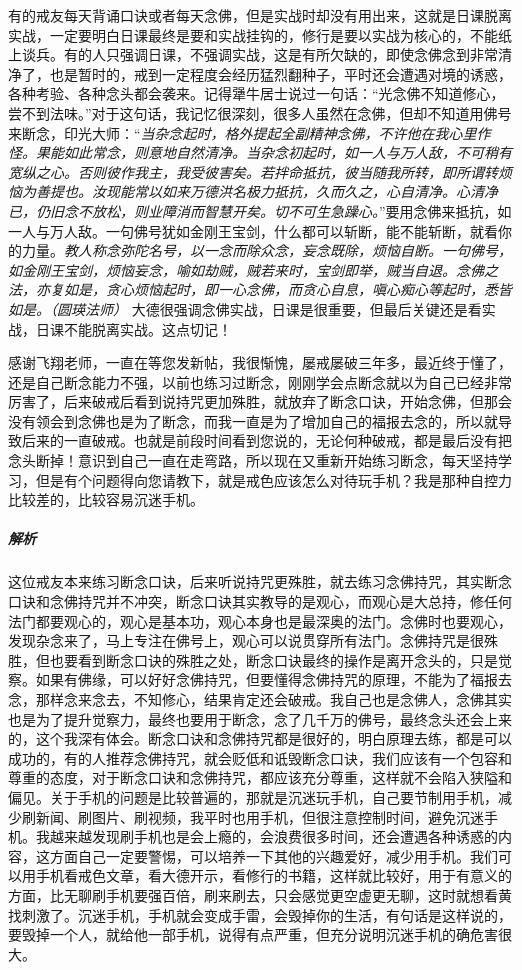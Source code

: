 有的戒友每天背诵口诀或者每天念佛，但是实战时却没有用出来，这就是日课脱离实战，一定要明白日课最终是要和实战挂钩的，修行是要以实战为核心的，不能纸上谈兵。有的人只强调日课，不强调实战，这是有所欠缺的，即使念佛念到非常清净了，也是暂时的，戒到一定程度会经历猛烈翻种子，平时还会遭遇对境的诱惑，各种考验、各种念头都会袭来。记得犟牛居士说过一句话：“光念佛不知道修心，尝不到法味。”对于这句话，我记忆很深刻，很多人虽然在念佛，但却不知道用佛号来断念，印光大师：“\textit{当杂念起时，格外提起全副精神念佛，不许他在我心里作怪。果能如此常念，则意地自然清净。当杂念初起时，如一人与万人敌，不可稍有宽纵之心。否则彼作我主，我受彼害矣。若拌命抵抗，彼当随我所转，即所谓转烦恼为善提也。汝现能常以如来万德洪名极力抵抗，久而久之，心自清净。心清净已，仍旧念不放松，则业障消而智慧开矣。切不可生急躁心。}”要用念佛来抵抗，如一人与万人敌。一句佛号犹如金刚王宝剑，什么都可以斩断，能不能斩断，就看你的力量。\textit{教人称念弥陀名号，以一念而除众念，妄念既除，烦恼自断。一句佛号，如金刚王宝剑，烦恼妄念，喻如劫贼，贼若来时，宝剑即举，贼当自退。念佛之法，亦复如是，贪心烦恼起时，即一心念佛，而贪心自息，嗔心痴心等起时，悉皆如是。（圆瑛法师）} 大德很强调念佛实战，日课是很重要，但最后关键还是看实战，日课不能脱离实战。这点切记！

\begin{case}[练习过程中的问题]
    感谢飞翔老师，一直在等您发新帖，我很惭愧，屡戒屡破三年多，最近终于懂了，还是自己断念能力不强，以前也练习过断念，刚刚学会点断念就以为自己已经非常厉害了，后来破戒后看到说持咒更加殊胜，就放弃了断念口诀，开始念佛，但那会没有领会到念佛也是为了断念，而我一直是为了增加自己的福报去念的，所以就导致后来的一直破戒。也就是前段时间看到您说的，无论何种破戒，都是最后没有把念头断掉！意识到自己一直在走弯路，所以现在又重新开始练习断念，每天坚持学习，但是有个问题得向您请教下，就是戒色应该怎么对待玩手机？我是那种自控力比较差的，比较容易沉迷手机。
    \subparagraph{解析} 这位戒友本来练习断念口诀，后来听说持咒更殊胜，就去练习念佛持咒，其实断念口诀和念佛持咒并不冲突，断念口诀其实教导的是观心，而观心是大总持，修任何法门都要观心的，观心是基本功，观心本身也是最深奥的法门。念佛时也要观心，发现杂念来了，马上专注在佛号上，观心可以说贯穿所有法门。念佛持咒是很殊胜，但也要看到断念口诀的殊胜之处，断念口诀最终的操作是离开念头的，只是觉察。如果有佛缘，可以好好念佛持咒，但要懂得念佛持咒的原理，不能为了福报去念，那样念来念去，不知修心，结果肯定还会破戒。我自己也是念佛人，念佛其实也是为了提升觉察力，最终也要用于断念，念了几千万的佛号，最终念头还会上来的，这个我深有体会。断念口诀和念佛持咒都是很好的，明白原理去练，都是可以成功的，有的人推荐念佛持咒，就会贬低和诋毁断念口诀，我们应该有一个包容和尊重的态度，对于断念口诀和念佛持咒，都应该充分尊重，这样就不会陷入狭隘和偏见。关于手机的问题是比较普遍的，那就是沉迷玩手机，自己要节制用手机，减少刷新闻、刷图片、刷视频，我平时也用手机，但很注意控制时间，避免沉迷手机。我越来越发现刷手机也是会上瘾的，会浪费很多时间，还会遭遇各种诱惑的内容，这方面自己一定要警惕，可以培养一下其他的兴趣爱好，减少用手机。我们可以用手机看戒色文章，看大德开示，看修行的书籍，这样就比较好，用于有意义的方面，比无聊刷手机要强百倍，刷来刷去，只会感觉更空虚更无聊，这时就想看黄找刺激了。沉迷手机，手机就会变成手雷，会毁掉你的生活，有句话是这样说的，要毁掉一个人，就给他一部手机，说得有点严重，但充分说明沉迷手机的确危害很大。
\end{case}

